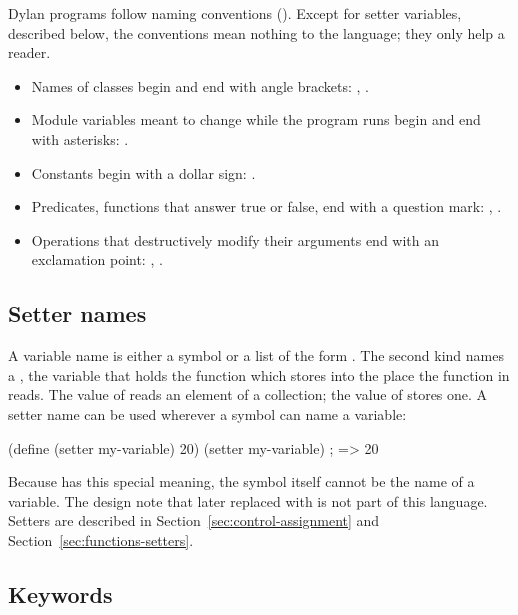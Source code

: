 Dylan programs follow naming conventions (). Except
for setter variables, described below, the conventions mean nothing to the
language; they only help a reader.

\begin{itemize}
\item Names of classes begin and end with angle brackets: ,
  .
\item Module variables meant to change while the program runs begin and
  end with asterisks: .
\item Constants begin with a dollar sign: .
\item Predicates, functions that answer true or false, end with a question
  mark: , .
\item Operations that destructively modify their arguments end with an
  exclamation point: , .
\end{itemize}

\subsection{Setter names}\label{sec:syntax-setter-names}

A variable name is either a symbol or a list of the form
. The second kind names a , the variable that holds the function which stores into the
place the function in  reads. The value of  reads
an element of a collection; the value of  stores
one. A setter name can be used wherever a symbol can name a variable:

\begin{dylan}
(define (setter my-variable) 20)
(setter my-variable)            ; => 20
\end{dylan}

\noindent Because  has this special meaning, the symbol
 itself cannot be the name of a variable. The design note that
later replaced  with  is not part of
this language. Setters are described in Section~\ref{sec:control-assignment} and
Section~\ref{sec:functions-setters}.

\subsection{Keywords}\label{sec:syntax-keywords}

